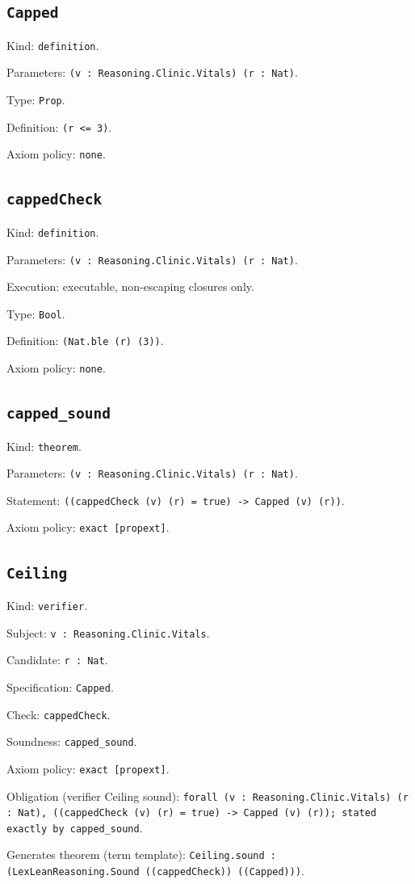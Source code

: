 \documentclass[11pt]{article}
\begin{document}
\subsection*{\texttt{Capped}}
\noindent Kind: \texttt{definition}.\par
\noindent Parameters: \texttt{(v : Reasoning.Clinic.Vitals) (r : Nat)}.\par
\noindent Type: \texttt{Prop}.\par
\noindent Definition: \texttt{(r <= 3)}.\par
\noindent Axiom policy: \texttt{none}.\par
\subsection*{\texttt{cappedCheck}}
\noindent Kind: \texttt{definition}.\par
\noindent Parameters: \texttt{(v : Reasoning.Clinic.Vitals) (r : Nat)}.\par
\noindent Execution: executable, non-escaping closures only.\par
\noindent Type: \texttt{Bool}.\par
\noindent Definition: \texttt{(Nat.ble (r) (3))}.\par
\noindent Axiom policy: \texttt{none}.\par
\subsection*{\texttt{capped\_sound}}
\noindent Kind: \texttt{theorem}.\par
\noindent Parameters: \texttt{(v : Reasoning.Clinic.Vitals) (r : Nat)}.\par
\noindent Statement: \texttt{((cappedCheck (v) (r) = true) -> Capped (v) (r))}.\par
\noindent Axiom policy: \texttt{exact [propext]}.\par
\subsection*{\texttt{Ceiling}}
\noindent Kind: \texttt{verifier}.\par
\noindent Subject: \texttt{v : Reasoning.Clinic.Vitals}.\par
\noindent Candidate: \texttt{r : Nat}.\par
\noindent Specification: \texttt{Capped}.\par
\noindent Check: \texttt{cappedCheck}.\par
\noindent Soundness: \texttt{capped\_sound}.\par
\noindent Axiom policy: \texttt{exact [propext]}.\par
\noindent Obligation (verifier Ceiling sound): \texttt{forall (v : Reasoning.Clinic.Vitals) (r : Nat), ((cappedCheck (v) (r) = true) -> Capped (v) (r)); stated exactly by capped\_sound}.\par
\noindent Generates theorem (term template): \texttt{Ceiling.sound : (LexLeanReasoning.Sound ((cappedCheck)) ((Capped)))}.\par
\end{document}
